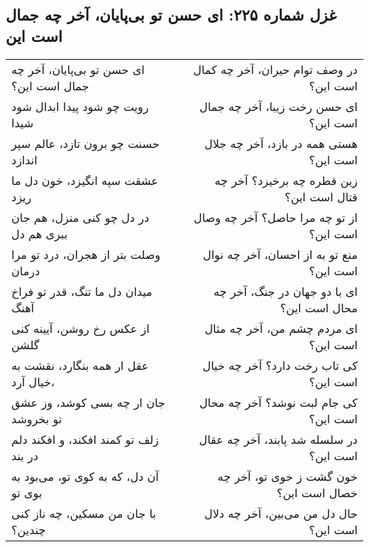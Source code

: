 \begin{center}
\section*{غزل شماره ۲۲۵: ای حسن تو بی‌پایان، آخر چه جمال است این}
\label{sec:225}
\begin{longtable}{l p{0.5cm} r}
ای حسن تو بی‌پایان، آخر چه جمال است این؟
&&
در وصف توام حیران، آخر چه کمال است این؟
\\
رویت چو شود پیدا ابدال شود شیدا
&&
ای حسن رخت زیبا، آخر چه جمال است این؟
\\
حسنت چو برون تازد، عالم سپر اندازد
&&
هستی همه در بازد، آخر چه جلال است این؟
\\
عشقت سپه انگیزد، خون دل ما ریزد
&&
زین قطره چه برخیزد؟ آخر چه قتال است این؟
\\
در دل چو کنی منزل، هم جان ببری هم دل
&&
از تو چه مرا حاصل؟ آخر چه وصال است این؟
\\
وصلت بتر از هجران، درد تو مرا درمان
&&
منع تو به از احسان، آخر چه نوال است این؟
\\
میدان دل ما تنگ، قدر تو فراخ آهنگ
&&
ای با دو جهان در جنگ، آخر چه محال است این؟
\\
از عکس رخ روشن، آیینه کنی گلشن
&&
ای مردم چشم من، آخر چه مثال است این؟
\\
عقل ار همه بنگارد، نقشت به خیال آرد،
&&
کی تاب رخت دارد؟ آخر چه خیال است این؟
\\
جان ار چه بسی کوشد، وز عشق تو بخروشد
&&
کی جام لبت نوشد؟ آخر چه محال است این؟
\\
زلف تو کمند افکند، و افکند دلم در بند
&&
در سلسله شد پابند، آخر چه عقال است این؟
\\
آن دل، که به کوی تو، می‌بود به بوی تو
&&
خون گشت ز خوی تو، آخر چه خصال است این؟
\\
با جان من مسکین، چه ناز کنی چندین؟
&&
حال دل من می‌بین، آخر چه دلال است این؟
\\
\end{longtable}
\end{center}
